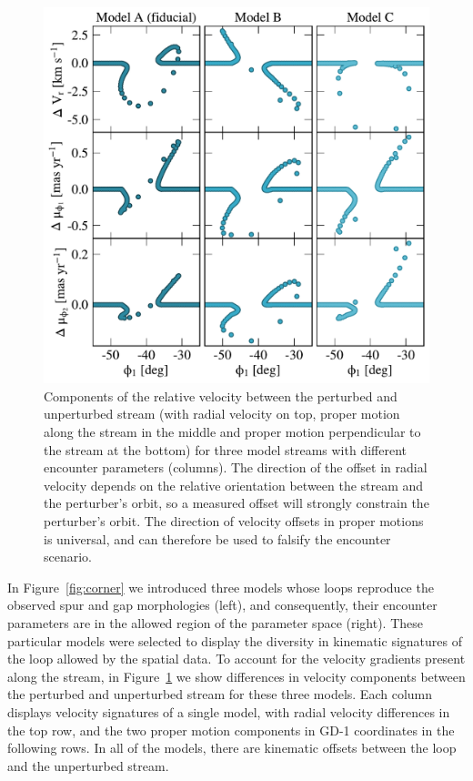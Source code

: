 \documentclass[twocolumn]{aastex62}
\begin{document}
\begin{figure}
\begin{center}
\includegraphics[width=\columnwidth]{kinematic_predictions.pdf}
\end{center}
\caption{Components of the relative velocity between the perturbed and unperturbed stream (with radial velocity on top, proper motion along the stream in the middle and proper motion perpendicular to the stream at the bottom) for three model streams with different encounter parameters (columns).
The direction of the offset in radial velocity depends on the relative orientation between the stream and the perturber's orbit, so a measured offset will strongly constrain the perturber's orbit.
The direction of velocity offsets in proper motions is universal, and can therefore be used to falsify the encounter scenario.
}
\label{fig:predictions}
\end{figure}

In Figure~\ref{fig:corner} we introduced three models whose loops reproduce the observed spur and gap morphologies (left), and consequently, their encounter parameters are in the allowed region of the parameter space (right).
These particular models were selected to display the diversity in kinematic signatures of the loop allowed by the spatial data.
To account for the velocity gradients present along the stream, in Figure~\ref{fig:predictions} we show differences in velocity components between the perturbed and unperturbed stream for these three models.
Each column displays velocity signatures of a single model, with radial velocity differences in the top row, and the two proper motion components in GD-1 coordinates in the following rows.
In all of the models, there are kinematic offsets between the loop and the unperturbed stream.
\end{document}
